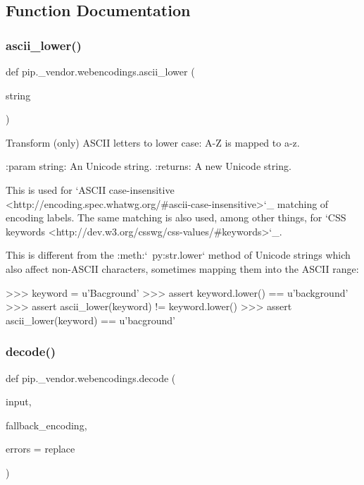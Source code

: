 \subsection{Function Documentation}
\mbox{\label{namespacepip_1_1__vendor_1_1webencodings_afa97e391f2b68992094a339176eff233}} 
\subsubsection{\texorpdfstring{ascii\+\_\+lower()}{ascii\_lower()}}
{\footnotesize\ttfamily def pip.\+\_\+vendor.\+webencodings.\+ascii\+\_\+lower (\begin{DoxyParamCaption}\item[{}]{string }\end{DoxyParamCaption})}

\begin{DoxyVerb}Transform (only) ASCII letters to lower case: A-Z is mapped to a-z.

:param string: An Unicode string.
:returns: A new Unicode string.

This is used for `ASCII case-insensitive
<http://encoding.spec.whatwg.org/#ascii-case-insensitive>`_
matching of encoding labels.
The same matching is also used, among other things,
for `CSS keywords <http://dev.w3.org/csswg/css-values/#keywords>`_.

This is different from the :meth:`~py:str.lower` method of Unicode strings
which also affect non-ASCII characters,
sometimes mapping them into the ASCII range:

    >>> keyword = u'Bacground'
    >>> assert keyword.lower() == u'background'
    >>> assert ascii_lower(keyword) != keyword.lower()
    >>> assert ascii_lower(keyword) == u'bacground'\end{DoxyVerb}
 \mbox{\label{namespacepip_1_1__vendor_1_1webencodings_a8de11e3f8c23c682f8e367d23462a5d0}} 
\subsubsection{\texorpdfstring{decode()}{decode()}}
{\footnotesize\ttfamily def pip.\+\_\+vendor.\+webencodings.\+decode (\begin{DoxyParamCaption}\item[{}]{input,  }\item[{}]{fallback\+\_\+encoding,  }\item[{}]{errors = {\ttfamily \textquotesingle{}replace\textquotesingle{}} }\end{DoxyParamCaption})}

